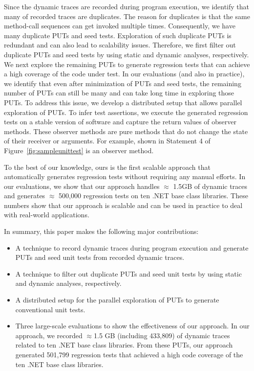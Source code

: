 Since the dynamic traces are recorded during program execution, 
we identify that many of recorded traces are duplicates. The 
reason for duplicates is that the same method-call sequences
can get invoked multiple times. Consequently, we have many duplicate PUTs and seed tests. 
Exploration of such duplicate PUTs is redundant and can also
lead to scalability issues. Therefore, we first filter
out duplicate PUTs and seed tests by using static and 
dynamic analyses, respectively. We next explore the remaining
PUTs to generate regression tests that can achieve a high coverage
of the code under test. In our evaluations (and also in practice), 
we identify that even after minimization of PUTs and seed tests, 
the remaining number of PUTs can still be many and can take long
time in exploring those PUTs. To address this issue, we develop a 
distributed setup that allows parallel exploration of PUTs.
To infer test assertions, we execute the generated regression
tests on a stable version of software and capture the return values
of observer methods. These observer methods are pure methods
that do not change the state of their receiver or arguments. For example,
 shown in Statement 4 of Figure~\ref{fig:sampleunittest} is
an observer method.

To the best of our knowledge, ours is the first scalable
approach that automatically generates regression tests without 
requiring any manual efforts. In our evaluations, we show that our approach handles 
$\approx$ 1.5GB of dynamic traces and generates $\approx$ 500,000 regression tests
on ten .NET base class libraries. These numbers show that our approach
is scalable and can be used in practice to deal with real-world applications.

In summary, this paper makes the following major contributions:

\begin{itemize}
\item A technique to record dynamic traces during program execution and generate PUTs and seed
unit tests from recorded dynamic traces.
\item A technique to filter out duplicate PUTs and seed unit tests by 
using static and dynamic analyses, respectively.
\item A distributed setup for the parallel exploration of PUTs to generate conventional
unit tests.
\item Three large-scale evaluations to show the effectiveness of our approach. 
In our approach, we recorded $\approx$1.5 GB (including 433,809) of dynamic traces related
to ten .NET base class libraries. From these PUTs,
our approach generated 501,799 regression tests that achieved a
high code coverage of the ten .NET base class libraries. 
\end{itemize}

